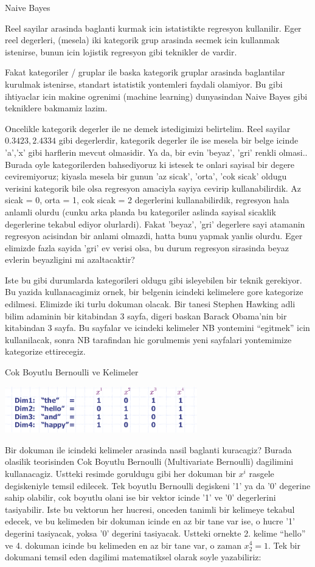 \documentclass[12pt,fleqn]{article}
\begin{document}
Naive Bayes

Reel sayilar arasinda baglanti kurmak icin istatistikte regresyon
kullanilir. Eger reel degerleri, (mesela) iki kategorik grup arasinda secmek
icin kullanmak istenirse, bunun icin lojistik regresyon gibi teknikler de
vardir.

Fakat kategoriler / gruplar ile baska kategorik gruplar arasinda baglantilar
kurulmak istenirse, standart istatistik yontemleri faydali olamiyor. Bu gibi
ihtiyaclar icin makine ogrenimi (machine learning) dunyasindan Naive Bayes gibi
tekniklere bakmamiz lazim.

Oncelikle kategorik degerler ile ne demek istedigimizi belirtelim. Reel sayilar
$0.3423, 2.4334$ gibi degerlerdir, kategorik degerler ile ise mesela bir belge
icinde 'a','x' gibi harflerin mevcut olmasidir. Ya da, bir evin 'beyaz', 'gri'
renkli olmasi.. Burada oyle kategorilerden bahsediyoruz ki istesek te onlari
sayisal bir degere ceviremiyoruz; kiyasla mesela bir gunun 'az sicak', 'orta',
'cok sicak' oldugu verisini kategorik bile olsa regresyon amaciyla sayiya
cevirip kullanabilirdik. Az sicak = 0, orta = 1, cok sicak = 2 degerlerini
kullanabilirdik, regresyon hala anlamli olurdu (cunku arka planda bu kategoriler
aslinda sayisal sicaklik degerlerine tekabul ediyor olurlardi). Fakat 'beyaz',
'gri' degerlere sayi atamanin regresyon acisindan bir anlami olmazdi, hatta bunu
yapmak yanlis olurdu. Eger elimizde fazla sayida 'gri' ev verisi olsa, bu durum
regresyon sirasinda beyaz evlerin beyazligini mi azaltacaktir?

Iste bu gibi durumlarda kategorileri oldugu gibi isleyebilen bir teknik
gerekiyor. Bu yazida kullanacagimiz ornek, bir belgenin icindeki kelimelere gore
kategorize edilmesi. Elimizde iki turlu dokuman olacak. Bir tanesi Stephen
Hawking adli bilim adaminin bir kitabindan 3 sayfa, digeri baskan Barack Obama'nin
bir kitabindan 3 sayfa. Bu sayfalar ve icindeki kelimeler NB yontemini
``egitmek'' icin kullanilacak, sonra NB tarafindan hic gorulmemis yeni sayfalari
yontemimize kategorize ettirecegiz.

Cok Boyutlu Bernoulli ve Kelimeler

\includegraphics[height=2cm]{dims.png}

Bir dokuman ile icindeki kelimeler arasinda nasil baglanti kuracagiz? Burada
olasilik teorisinden Cok Boyutlu Bernoulli (Multivariate Bernoulli) dagilimini
kullanacagiz. Ustteki resimde goruldugu gibi her dokuman bir $x^i$ rasgele
degiskeniyle temsil edilecek. Tek boyutlu Bernoulli degiskeni '1' ya da '0'
degerine sahip olabilir, cok boyutlu olani ise bir vektor icinde '1' ve '0'
degerlerini tasiyabilir. Iste bu vektorun her hucresi, onceden tanimli bir
kelimeye tekabul edecek, ve bu kelimeden bir dokuman icinde en az bir tane var
ise, o hucre '1' degerini tasiyacak, yoksa '0' degerini tasiyacak. Ustteki
ornekte 2. kelime ``hello'' ve 4. dokuman icinde bu kelimeden en az bir tane
var, o zaman $x_2^4 = 1$. Tek bir dokumani temsil eden dagilimi
matematiksel olarak soyle yazabiliriz:
\end{document}
